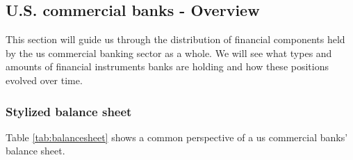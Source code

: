 \documentclass[12pt, a4paper]{article} %
\begin{document}

\subsection{U.S. commercial banks - Overview}
\label{sec:AssetLiabs}

This section will guide us through the distribution of financial components held by the us commercial banking sector as a whole. We will see what types and amounts of financial instruments banks are holding and how these positions evolved over time. 

\subsubsection{Stylized balance sheet}


Table \ref{tab:balancesheet} shows a common perspective of a us commercial banks' balance sheet.
\end{document}
